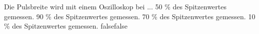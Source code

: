     {Die Pulsbreite wird mit einem Oszilloskop bei ...}
    {50 \% des Spitzenwertes gemessen.}
    {90 \% des Spitzenwertes gemessen.}
    {70 \% des Spitzenwertes gemessen.}
    {10 \% des Spitzenwertes gemessen.}
    {false}{false}